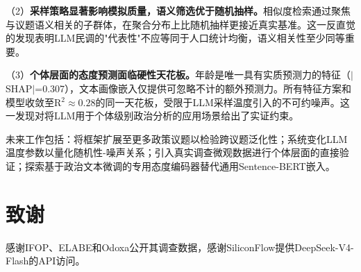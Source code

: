 \documentclass[11pt,a4paper]{ctexart}
\begin{document}
（2）\textbf{采样策略显著影响模拟质量，语义筛选优于随机抽样。}相似度检索通过聚焦与议题语义相关的子群体，在聚合分布上比随机抽样更接近真实基准。这一反直觉的发现表明LLM民调的"代表性"不应等同于人口统计均衡，语义相关性至少同等重要。

（3）\textbf{个体层面的态度预测面临硬性天花板。}年龄是唯一具有实质预测力的特征（$|$SHAP$|$=0.307），文本画像嵌入仅提供可忽略不计的额外预测力。所有特征方案和模型收敛至R$^2\approx 0.28$的同一天花板，受限于LLM采样温度引入的不可约噪声。这一发现对将LLM用于个体级别政治分析的应用场景给出了实证约束。

未来工作包括：将框架扩展至更多政策议题以检验跨议题泛化性；系统变化LLM温度参数以量化随机性-噪声关系；引入真实调查微观数据进行个体层面的直接验证；探索基于政治文本微调的专用态度编码器替代通用Sentence-BERT嵌入。

\section*{致谢}
感谢IFOP、ELABE和Odoxa公开其调查数据，感谢SiliconFlow提供DeepSeek-V4-Flash的API访问。
\end{document}
